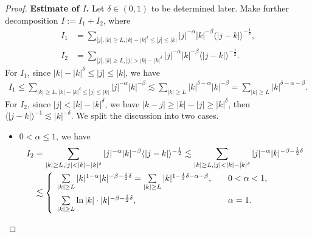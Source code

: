 \documentclass[preprint,12pt]{elsarticle}
\begin{document}
\begin{proof}
{\bf Estimate of $I$.} Let $\delta\in (0,1)$ to be determined later. Make further decomposition
$I:=I_1+I_2$,  where
 \begin{align}
I_1 &= \sum_{|j|,|k|\ge L, |k|-|k|^\delta\leq |j|\leq |k|} |j|^{-\alpha}|k|^{-\beta}\langle |j-k|\rangle^{-\frac{1}{2}},\label{equ-426-14}\\
I_2 &= \sum_{|j|,|k|\ge L, |j|> |k|-|k|^\delta} |j|^{-\alpha}|k|^{-\beta}\langle |j-k|\rangle^{-\frac{1}{2}}.\label{equ-426-15}
 \end{align}
For $I_1$,  since $|k|-|k|^\delta\le |j|\le |k|$, we have
\begin{align}\label{equ-426-16}
       I_1       \le  \sum_{|k|\ge L,|k|-|k|^\delta\le|j|\le |k|}|j|^{-\alpha}|k|^{-\beta}
       \lesssim  \sum_{|k|\ge L}|k|^{\delta-\alpha}|k|^{-\beta}=\sum_{|k|\ge L}|k|^{\delta-\alpha-\beta}.
\end{align}
For $I_2$, since $|j|<|k|-|k|^\delta$, we have $|k-j|\ge |k|-|j|\ge |k|^\delta$, then  $\langle |j-k| \rangle^{-1}\lesssim|k|^{-\delta}$. We split the discussion into two cases.
     \begin{itemize}
        \item  $0<\alpha\leq 1$, we have
     \begin{align}
        I_2&= \sum_{|k|\ge L,|j|<|k|-|k|^\delta}|j|^{-\alpha}|k|^{-\beta}\langle |j-k|\rangle^{-\frac{1}{2}}\lesssim \sum_{|k|\ge L,|j|<|k|-|k|^{\delta}}|j|^{-\alpha}|k|^{-\beta-\frac{1}{2}\delta}\nonumber\\
        &\lesssim
     \left\{
     \begin{array}{ll}
     \sum_{|k|\ge L }\limits|k|^{1-\alpha}|k|^{-\beta-\frac{1}{2}\delta}=\sum_{|k|\ge L}\limits|k|^{1-\frac{1}{2}\delta-\alpha-\beta}, \quad & 0<\alpha<1, \vspace{1ex}\\
      \sum_{|k|\ge L }\limits\ln|k|\cdot|k|^{-\beta-\frac{1}{2}\delta}, \quad & \alpha=1.
     \end{array}
     \right. \label{equ-426-17}
     \end{align}


\end{itemize}
\end{proof}
\end{document}
